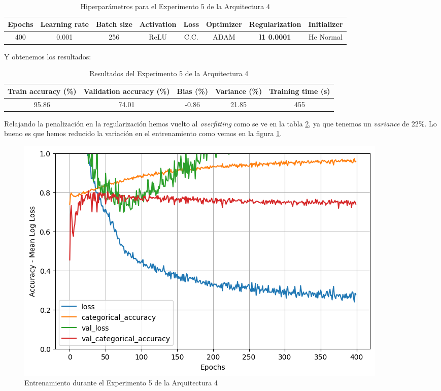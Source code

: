\documentclass{article}
\begin{document}
			\begin{table}[!h]
				\begin{tabular}{|c|c|c|c|c|c|c|c|}
					\textbf{Epochs}&\textbf{Learning rate}&\textbf{Batch size}&\textbf{Activation}&\textbf{Loss}&\textbf{Optimizer}&\textbf{Regularization}  & \textbf{Initializer} \\ \hline
					400 & 0.001 & 256 & ReLU & C.C. & ADAM & \textbf{l1 0.0001} & He Normal
				\end{tabular}
				\caption{Hiperpar\'ametros para el Experimento 5 de la Arquitectura 4}
				\label{tab:hip-d-a4-e5}
			\end{table}
   
			Y obtenemos los resultados:
			\begin{table}[!h]
				\begin{center}
					\begin{tabular}{| c | c | c | c | c |}
						\textbf{Train accuracy (\%)} & \textbf{Validation accuracy (\%)} & \textbf{Bias (\%)} & \textbf{Variance (\%)} & \textbf{Training time (s)} \\ \hline
						95.86 & 74.01 & -0.86 & 21.85 & 455 \\ \hline
					\end{tabular}
					\caption{Resultados del Experimento 5 de la Arquitectura 4}
					\label{tab:res-d-a4-e5}
				\end{center}
			\end{table}

			Relajando la penalizaci\'on en la regularizaci\'on hemos vuelto al \textit{overfitting} como se ve en la tabla \ref{tab:res-d-a4-e5}, ya que tenemos un \textit{variance} de 22\%. Lo bueno es que hemos reducido la variaci\'on en el entrenamiento como vemos en la figura \ref{d-tr-a4-e5}.
			\begin{figure}[!h]
				\begin{center}
					\includegraphics[scale=0.5]{d-tr-a4-e5.png}		
					\caption{Entrenamiento durante el Experimento 5 de la Arquitectura 4}	
					\label{d-tr-a4-e5}
				\end{center}
			\end{figure}
   
\end{document}
